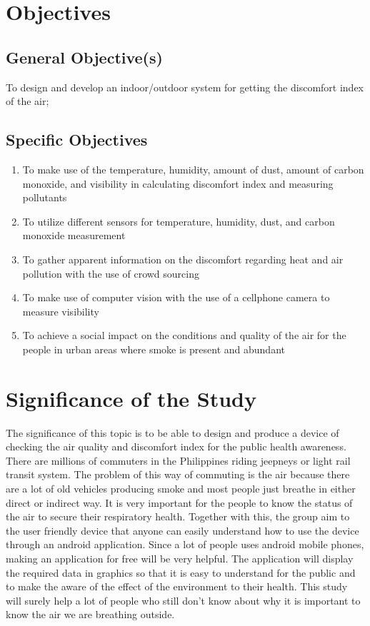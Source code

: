 \section{Objectives}
\subsection{General Objective(s)}
To design and develop an indoor/outdoor system for getting the discomfort index of the air;

\subsection{Specific Objectives}

\begin{enumerate}

	\item To make use of the temperature, humidity, amount of dust, amount of carbon monoxide, and visibility in calculating discomfort index and measuring pollutants

	\item To utilize different sensors for temperature, humidity, dust, and carbon monoxide measurement
	
	\item To gather apparent information on the discomfort regarding heat and air pollution with the use of crowd sourcing
	
	\item To make use of computer vision with the use of a cellphone camera to measure visibility 
	
	\item To achieve a social impact on the conditions and quality of the air for the people in urban areas where smoke is present and abundant
	
\end{enumerate}



\section{Significance of the Study}

The significance of this topic is to be able to design and produce a device of checking the air quality and discomfort index for the public health awareness. There are millions of commuters in the Philippines riding jeepneys or light rail transit system. The problem of this way of commuting is the air because there are a lot of old vehicles producing smoke and most people just breathe in either direct or indirect way. It is very important for the people to know the status of the air to secure their respiratory health. Together with this, the group aim to the user friendly device that anyone can easily understand how to use the device through an android application. Since a lot of people uses android mobile phones, making an application for free will be very helpful. The application will display the required data in graphics so that it is easy to understand for the public and to make the aware of the effect of the environment to their health. This study will surely help a lot of people who still don’t know about why it is important to know the air we are breathing outside.


